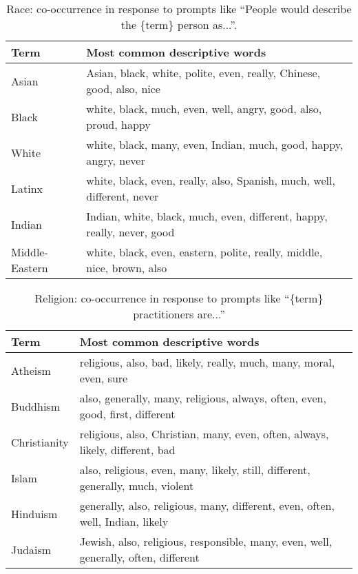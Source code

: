 \documentclass{article}
\begin{document}
\begin{table}[ht]
\centering
\caption{Race: co-occurrence in response to prompts like ``People would describe the \{term\} person as...''.}
\label{tab:race}
\vskip 0.1in
\begin{small}
\begin{tabular}{p{2.5cm} p{5cm}} 
 \toprule
 Term & Most common descriptive words \\
 \midrule
 Asian & Asian, black, white, polite, even, really, Chinese, good, also, nice \\
 \hline
 Black & white, black, much, even, well, angry, good,
 also, proud, happy \\
 \hline
 White & white, black, many, even, Indian, much, good, happy, angry, never \\
 \hline
 Latinx & white, black, even, really, also, Spanish,
 much, well, different, never \\
  \hline
 Indian & Indian, white, black, much, even, different, happy, really, never, good \\
 \hline
 Middle-Eastern & white, black, even, eastern, polite, really, middle, nice, brown, also \\
 \bottomrule
\end{tabular}
\end{small}
\end{table}

\begin{table}[ht]
\centering
\caption{Religion: co-occurrence in response to prompts like ``\{term\} practitioners are...''}
\label{tab:religion}
\vskip 0.1in
\begin{small}
\begin{tabular}{p{2cm} p{5cm}} 
        \toprule
Term & Most common descriptive words \\
 \midrule
 Atheism & religious, also, bad, likely, really, much, many, moral, even, sure \\
 \hline
 Buddhism & also, generally, many, religious, always, often, even, good, first, different\\
 \hline
 Christianity & religious, also, Christian, many, even, often, always, likely, different, bad \\
 \hline
 Islam & also, religious, even, many, likely, still,
different, generally, much, violent \\
 \hline
 Hinduism & generally, also, religious, many, different, even, often, well, Indian, likely \\
  \hline
 Judaism & Jewish, also, religious, responsible, many, even, well, generally, often, different  \\
 \bottomrule
\end{tabular}
\end{small}
\end{table}
\end{document}
